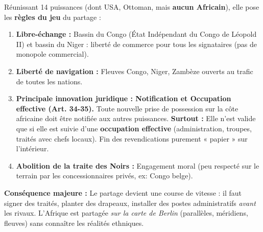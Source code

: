 \documentclass[11pt]{article}
\begin{document}
\begin{definition}
Réunissant 14 puissances (dont USA, Ottoman, mais \textbf{aucun Africain}), elle pose les \textbf{règles du jeu} du partage :
\begin{enumerate}
    \item \textbf{Libre-échange :} Bassin du Congo (État Indépendant du Congo de Léopold II) et bassin du Niger : liberté de commerce pour tous les signataires (pas de monopole commercial).
    \item \textbf{Liberté de navigation :} Fleuves Congo, Niger, Zambèze ouverts au trafic de toutes les nations.
    \item \textbf{Principale innovation juridique : Notification et Occupation effective (Art. 34-35).} Toute nouvelle prise de possession sur la côte africaine doit être notifiée aux autres puissances. \textbf{Surtout :} Elle n'est valide que si elle est suivie d'une \textbf{occupation effective} (administration, troupes, traités avec chefs locaux). Fin des revendications purement « papier » sur l'intérieur.
    \item \textbf{Abolition de la traite des Noirs :} Engagement moral (peu respecté sur le terrain par les concessionnaires privés, ex: Congo belge).
\end{enumerate}
\textbf{Conséquence majeure :} Le partage devient une course de vitesse : il faut signer des traités, planter des drapeaux, installer des postes administratifs \emph{avant} les rivaux. L'Afrique est partagée \emph{sur la carte de Berlin} (parallèles, méridiens, fleuves) sans connaître les réalités ethniques.
\end{definition}
\end{document}
